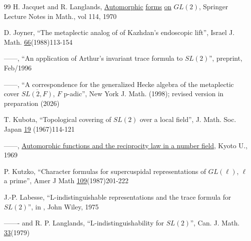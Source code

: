 \documentclass[12pt,letterpaper]{book}
\theoremstyle{plain}
\theoremstyle{definition}
\theoremstyle{remark}
\theoremstyle{remark}
\begin{document}
\begin{thebibliography}{99}
 H. Jacquet and R. Langlands,
\underline{Automorphic} \underline{forms}
\underline{on} \underline{$GL(2)$}, Springer Lecture Notes in Math.,
vol 114, 1970

 D. Joyner, ``The metaplectic analog of of Kazhdan's
endoscopic lift'', Israel J. Math. \underline{66}(1988)113-154

 ------, ``An application of Arthur's invariant
trace formula to $SL(2)$'', preprint, Feb/1996

 ------, ``A correspondence for the generalized Hecke
algebra of the metaplectic cover $\overline{SL(2,F)}$, $F$ p-adic'',
New York J. Math.  (1998); revised version in preparation (2026)






 T. Kubota, ``Topological covering of $SL(2)$ over a
local field'', J.
Math. Soc. Japan \underline{19} (1967)114-121

 ------, \underline{Automorphic functions and the reciprocity
law in a number field}, Kyoto U., 1969


 P. Kutzko,
``Character formulas for supercuspidal representations of
$GL(\ell)$, $\ell$ a prime'', Amer J Math \underline{109}(1987)201-222

 J.-P. Labesse, ``L-indistinguishable representations
and the trace formula for $SL(2)$'', in
, John Wiley, 1975

 ------- and R. P. Langlands,
``L-indistinguishability for
$SL(2)$'', Can. J. Math. \underline{33}(1979)


\end{thebibliography}
\end{document}
